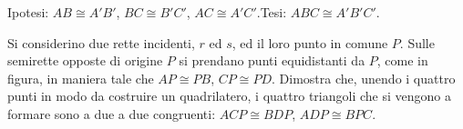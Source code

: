 \begin{inaccessibleblock}
  \begin{figure}[htb]
    \centering
  \end{figure}
\end{inaccessibleblock}

\noindent Ipotesi: $AB\cong A'B'$, $BC\cong B'C'$, $AC\cong 
A'C'$.\tab Tesi: $ABC\cong A'B'C'$.


\begin{exrig}
% 
% 
% 
% 
% 
% 
\begin{esempio}\label{esempio:2.1}
Si considerino due rette incidenti, $r$ ed $s$, ed il loro punto in 
comune $P$. Sulle semirette opposte di origine $P$ si prendano punti 
equidistanti da $P$, come in figura, in maniera tale che $AP\cong 
PB$, $CP\cong PD$. Dimostra che, unendo i quattro punti in modo da 
costruire un quadrilatero, i quattro triangoli che si vengono a 
formare sono a due a due congruenti: $ACP\cong BDP$, $ADP\cong BPC$.


\end{esempio}
\end{exrig}
